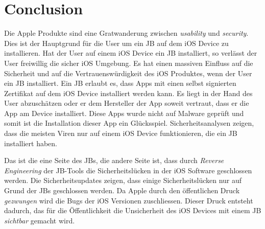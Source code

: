 %
%
%
% 


\chapter{Conclusion}
\label{ch:Conclusion}
Die Apple Produkte sind eine Gratwanderung zwischen \textit{\glqq usability\grqq{}} und \textit{\glqq security\grqq{}}. Dies ist der Hauptgrund für die User um ein JB auf dem iOS Device zu installieren. Hat der User auf einem iOS Device ein JB installiert, so verlässt der User freiwillig die sicher iOS Umgebung. Es hat einen  massiven Einfluss auf die Sicherheit und auf die Vertrauenswürdigkeit des iOS Produktes, wenn der User ein JB installiert. Ein JB erlaubt es, dass Apps mit einen selbst signierten Zertifikat auf dem iOS Device installiert werden kann. Es liegt in der Hand des User abzuschätzen oder er dem Hersteller der App soweit vertraut, dass er die App am Device installiert. Diese Apps wurde nicht auf Malware geprüft und somit ist die Installation dieser App ein Glücksspiel. Sicherheitsanalysen zeigen, dass die meisten Viren nur auf einem iOS Device funktionieren, die ein JB installiert haben.\par  
Das ist die eine Seite des JBs, die andere Seite ist, dass durch \textit{\glqq Reverse Engineering\grqq{}} der JB-Tools die Sicherheitslücken in der iOS Software geschlossen werden. Die Sicherheitsupdates zeigen, dass einige Sicherheitslücken nur auf Grund der JBs geschlossen werden. Da Apple durch den öffentlichen Druck \textit{\glqq gezwungen\grqq{}} wird die Bugs der iOS Versionen zuschliessen. Dieser Druck entsteht dadurch, das für die Öffentlichkeit die Unsicherheit des iOS Devices mit einem JB \textit{\glqq sichtbar\grqq{}} gemacht wird. 

